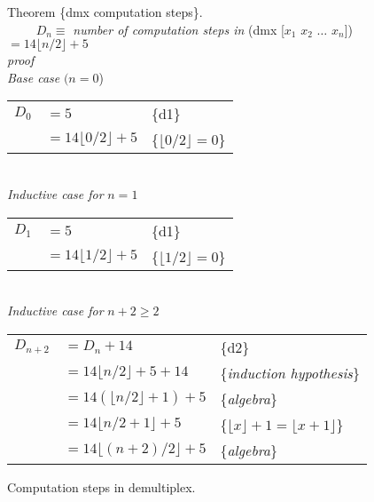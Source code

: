 \begin{figure}
Theorem \{dmx computation steps\}. \\
~~~~ $D_n \equiv$ \emph{number of computation steps in} \textsf{(dmx [$x_1$ $x_2$ $\dots$ $x_n$])} $= 14\lfloor n/2\rfloor + 5$\\
\emph{proof} \vspace{1mm}\\
\emph{Base case} $(n=0$) \\
\begin{tabular}{lll}
$D_{0}$&$= 5$                        & \{d1\} \\
       &$= 14\lfloor 0/2\rfloor + 5$ & \{$\lfloor 0/2\rfloor=0$\} \\
\end{tabular}
\vspace{1mm}\\
\emph{Inductive case for} $n=1$\\
\begin{tabular}{lll}
$D_{1}$&$= 5$                        & \{d1\} \\
       &$= 14\lfloor 1/2\rfloor + 5$ & \{$\lfloor 1/2\rfloor=0$\} \\
\end{tabular}
\vspace{1mm}\\
\emph{Inductive case for} $n+2 \geq 2$\\
\begin{tabular}{lll}
$D_{n+2}$ &$= D_n + 14$                      & \{d2\} \\
          &$= 14\lfloor n/2\rfloor + 5 + 14$ & \{\emph{induction hypothesis}\} \\
          &$= 14(\lfloor n/2\rfloor + 1) + 5$& \{\emph{algebra}\} \\
          &$= 14\lfloor n/2 + 1\rfloor + 5$  & \{$\lfloor x\rfloor + 1 = \lfloor x+1\rfloor$\} \\
          &$= 14\lfloor(n+2)/2\rfloor + 5$   & \{\emph{algebra}\} \\
\end{tabular}
\caption{Computation steps in demultiplex.}
\label{fig:dmx-computation-time}
\end{figure}

